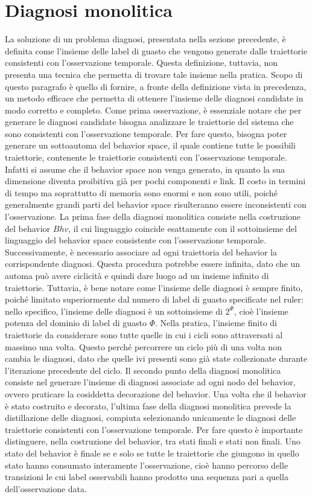 \section{Diagnosi monolitica}
La soluzione di un problema diagnosi, presentata nella sezione precedente, è definita come l'insieme delle label di guasto che vengono generate dalle traiettorie consistenti con l'osservazione temporale. Questa definizione, tuttavia, non presenta una tecnica che permetta di trovare tale insieme nella pratica. Scopo di questo paragrafo è quello di fornire, a fronte della definizione vista in precedenza, un metodo efficace che permetta di ottenere l'insieme delle diagnosi candidate in modo corretto e completo. 
Come prima osservazione, è essenziale notare che per generare le diagnosi candidate bisogna analizzare le traiettorie del sistema che sono consistenti con l'osservazione temporale. Per fare questo, bisogna poter generare un sottoautoma del behavior space, il quale contiene tutte le possibili traiettorie, contenente le traiettorie consistenti con l'osservazione temporale. Infatti si assume che il behavior space non venga generato, in quanto la sua dimensione diventa proibitiva già per pochi componenti e link. Il costo in termini di tempo ma soprattutto di memoria sono enormi e non sono utili, poiché generalmente grandi parti del behavior space risulteranno essere inconsistenti con l'osservazione.
La prima fase della diagnosi monolitica consiste nella costruzione del behavior $Bhv$, il cui linguaggio coincide esattamente con il sottoinsieme del linguaggio del behavior space consistente con l'osservazione temporale. Successivamente, è necessario associare ad ogni traiettoria del behavior la corrispondente diagnosi. Questa procedura potrebbe essere infinita, dato che un automa può avere ciclicità e quindi dare luogo ad un insieme infinito di traiettorie. Tuttavia, è bene notare come l'insieme delle diagnosi è sempre finito, poiché limitato superiormente dal numero di label di guasto specificate nel ruler: nello specifico, l'insieme delle diagnosi è un sottoinsieme di $2^\Phi$, cioè l'insieme potenza del dominio di label di guasto $\Phi$. Nella pratica, l'insieme finito di traiettorie da considerare sono tutte quelle in cui i cicli sono attraversati al massimo una volta. Questo perché percorrere un ciclo più di una volta non cambia le diagnosi, dato che quelle ivi presenti sono già state collezionate durante l'iterazione precedente del ciclo.
Il secondo punto della diagnosi monolitica consiste nel generare l'insieme di diagnosi associate ad ogni nodo del behavior, ovvero praticare la cosiddetta decorazione del behavior.
Una volta che il behavior è stato costruito e decorato, l'ultima fase della diagnosi monolitica prevede la distillazione delle diagnosi, compiuta selezionando unicamente le diagnosi delle traiettorie consistenti con l'osservazione temporale. Per fare questo è importante distinguere, nella costruzione del behavior, tra stati finali e stati non finali. Uno stato del behavior è finale se e solo se tutte le traiettorie che giungono in quello stato hanno consumato interamente l'osservazione, cioè hanno percorso delle transizioni le cui label osservabili hanno prodotto una sequenza pari a quella dell'osservazione data. 

